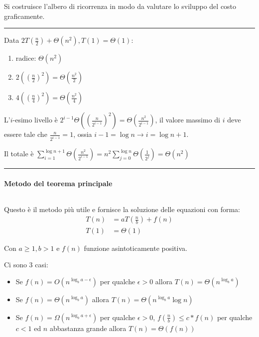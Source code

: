 \documentclass{article}
\begin{document}
\noindent Si costruisce l'albero di ricorrenza in modo da valutare lo sviluppo del costo graficamente.\newline

\noindent\rule{\textwidth}{0.5pt}\newline

\noindent Data $2T(\frac{n}{2})+\Theta(n^2),T(1)=\Theta(1)$:
\begin{enumerate}
    \item radice: $\Theta(n^2)$
    \item $2((\frac{n}{2})^2)=\Theta(\frac{n^2}{2})$
    \item $4((\frac{n}{4})^2)=\Theta(\frac{n^2}{4})$
\end{enumerate}

\noindent L'$i$-esimo livello è $2^{i-1}\Theta((\frac{n}{2^{i-1}})^2)=\Theta(\frac{n^2}{2^{i-1}})$, il valore massimo di $i$ deve essere tale che $\frac{n}{2^{i-1}}=1$, ossia $i-1=\log n\rightarrow i=\log n + 1$.\newline

\noindent Il totale è $\sum_{i=1}^{\log n +1}\Theta(\frac{n^2}{2^{i-1}})=n^2\sum_{j=0}^{\log n}\Theta(\frac{1}{2^{j}})=\Theta(n^2)$

\noindent\rule{\textwidth}{0.5pt}\newline

\paragraph{Metodo del teorema principale} $\ $\newline

\noindent Questo è il metodo più utile e fornisce la soluzione delle equazioni con forma:
\begin{equation}
    \nonumber
    \begin{split}
        T(n) & = aT(\frac{n}{b})+f(n)\\
        T(1) & = \Theta(1)
    \end{split}
\end{equation}

\noindent Con $a\geq1,b>1$ e $f(n)$ funzione asintoticamente positiva.\newline

\noindent Ci sono 3 casi:
\begin{itemize}
    \item Se $f(n)=O(n^{\log_ba-\epsilon})$ per qualche $\epsilon>0$ allora $T(n)=\Theta(n^{\log_ba})$
    
    \item Se $f(n)=\Theta(n^{\log_ba})$ allora $T(n)=\Theta(n^{\log_ba}\log n)$
    
    \item Se $f(n)=\Omega(n^{\log_ba+\epsilon})$ per qualche $\epsilon>0$, $f(\frac{n}{b})\leq c*f(n)$ per qualche $c<1$ ed $n$ abbastanza grande allora $T(n)=\Theta(f(n))$
\end{itemize}
\end{document}
